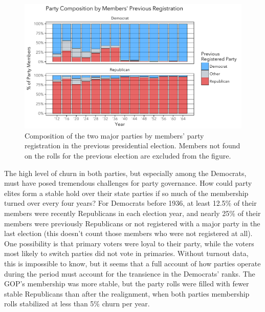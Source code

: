 \documentclass[11pt]{scrartcl}\usepackage[]{graphicx}\usepackage[]{color}
\makeatletter
\def\maxwidth{ %
  \ifdim\Gin@nat@width>\linewidth
    \linewidth
  \else
    \Gin@nat@width
  \fi
}
\newenvironment{knitrout}{}{} %
\makeatother
\begin{document}
\begin{knitrout}
\color{fgcolor}\begin{figure}

{\centering \includegraphics[width=\maxwidth]{figures/plots-party_composition-1} 

}

\caption[Composition of the two major parties by members' party registration in the previous presidential election]{Composition of the two major parties by members' party registration in the previous presidential election. Members not found on the rolls for the previous election are excluded from the figure.}\label{fig:party_composition}
\end{figure}


\end{knitrout}
 

The high level of churn in both parties, but especially among the Democrats, must have posed tremendous challenges for party governance. How could party elites form a stable hold over their state parties if so much of the membership turned over every four years? For Democrats before 1936, at least 12.5\% of their members were recently Republicans in each election year, and nearly 25\% of their members were previously Republicans or not registered with a major party in the last election (this doesn't count those members who were not registered at all). One possibility is that primary voters were loyal to their party, while the voters most likely to switch parties did not vote in primaries.  Without turnout data, this is impossible to know, but it seems that a full account of how parties operate during the period must account for the transience in the Democrats' ranks. The GOP's membership was more stable, but the party rolls were filled with fewer stable Republicans than after the realignment, when both parties membership rolls stabilized at less than 5\% churn per year.
\end{document}
